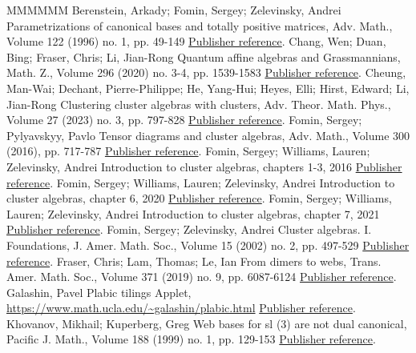 \begin{thebibliography}{MMMMMM}
 Berenstein, Arkady; Fomin, Sergey; Zelevinsky, Andrei Parametrizations of canonical bases and totally positive matrices, Adv. Math., Volume 122 (1996) no. 1, pp. 49-149 \href{https://alco.centre-mersenne.org/articles/10.5802/alco.376/#bfz96}{Publisher reference}.
 Chang, Wen; Duan, Bing; Fraser, Chris; Li, Jian-Rong Quantum affine algebras and Grassmannians, Math. Z., Volume 296 (2020) no. 3-4, pp. 1539-1583 \href{https://alco.centre-mersenne.org/articles/10.5802/alco.376/#quantum20}{Publisher reference}.
 Cheung, Man-Wai; Dechant, Pierre-Philippe; He, Yang-Hui; Heyes, Elli; Hirst, Edward; Li, Jian-Rong Clustering cluster algebras with clusters, Adv. Theor. Math. Phys., Volume 27 (2023) no. 3, pp. 797-828 \href{https://alco.centre-mersenne.org/articles/10.5802/alco.376/#clustering}{Publisher reference}.
 Fomin, Sergey; Pylyavskyy, Pavlo Tensor diagrams and cluster algebras, Adv. Math., Volume 300 (2016), pp. 717-787 \href{https://alco.centre-mersenne.org/articles/10.5802/alco.376/#fominpasha2016}{Publisher reference}.
 Fomin, Sergey; Williams, Lauren; Zelevinsky, Andrei Introduction to cluster algebras, chapters 1-3, 2016 \href{https://alco.centre-mersenne.org/articles/10.5802/alco.376/#fwz-ch1-3}{Publisher reference}.
 Fomin, Sergey; Williams, Lauren; Zelevinsky, Andrei Introduction to cluster algebras, chapter 6, 2020 \href{https://alco.centre-mersenne.org/articles/10.5802/alco.376/#fwz-ch6}{Publisher reference}.
 Fomin, Sergey; Williams, Lauren; Zelevinsky, Andrei Introduction to cluster algebras, chapter 7, 2021 \href{https://alco.centre-mersenne.org/articles/10.5802/alco.376/#fwz-ch7}{Publisher reference}.
 Fomin, Sergey; Zelevinsky, Andrei Cluster algebras. I. Foundations, J. Amer. Math. Soc., Volume 15 (2002) no. 2, pp. 497-529 \href{https://alco.centre-mersenne.org/articles/10.5802/alco.376/#fz02}{Publisher reference}.
 Fraser, Chris; Lam, Thomas; Le, Ian From dimers to webs, Trans. Amer. Math. Soc., Volume 371 (2019) no. 9, pp. 6087-6124 \href{https://alco.centre-mersenne.org/articles/10.5802/alco.376/#fll2019}{Publisher reference}.
 Galashin, Pavel Plabic tilings Applet, \url{https://www.math.ucla.edu/~galashin/plabic.html} \href{https://alco.centre-mersenne.org/articles/10.5802/alco.376/#applet}{Publisher reference}.
 Khovanov, Mikhail; Kuperberg, Greg Web bases for  sl (3) are not dual canonical, Pacific J. Math., Volume 188 (1999) no. 1, pp. 129-153 \href{https://alco.centre-mersenne.org/articles/10.5802/alco.376/#KhovKup}{Publisher reference}.

\end{thebibliography}
